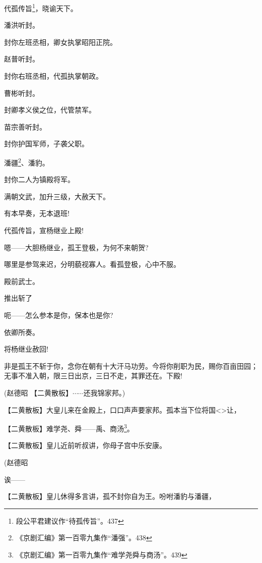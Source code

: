 {代孤传旨}\footnote{ 段公平君建议作``待孤传旨''。{437}}{，晓谕天下。}

{潘洪听封。}

{封你左班丞相，卿女执掌昭阳正院。}

{赵普听封。}

{封你右班丞相，代孤执掌朝政。}

{曹彬听封。}

{封卿孝义侯之位，代管禁军。}

{苗宗善听封。}

{封你护国军师，子袭父职。}

{潘疆}\footnote{ 《京剧汇编》第一{百}零九集作``潘强''。{438}}{、潘豹。}

{封你二人为镇殿将军。}

{满朝文武，加升三级，大赦天下。}

{有本早奏，无本退班!}

{代孤传旨，宣杨继业上殿!}

{嗯------大胆杨继业，孤王登极，为何不来朝贺?}

{哪里是参驾来迟，分明藐视寡人。看孤登极，心中不服。}

{殿前武士。}

{推出斩了}

{呃------怎么参本是你，保本也是你?}

{依卿所奏。}

{将杨继业赦回!}

{非是孤王不斩于你，念你在朝有十大汗马功劳。今将你削职为民，赐你百亩田园；无事不准入朝，限三日出京，三日不走，其罪还在。下殿!}

{(赵德昭 【{\akai 二黄散板}】$\cdots{}\cdots{}$还我锦家邦。)}

\setlength{\hangindent}{60pt} {【{\akai 二黄散板}】大皇儿来在金殿上，口口声声要家邦。}孤本当下位将国\textless{}\!\textgreater{}让，

\setlength{\hangindent}{60pt} {【{\akai 二黄散板}】}难学尧、舜------禹、商汤\footnote{ {《京剧汇编》第一百零九集}作``难学尧舜与商汤''。{439}}。

\setlength{\hangindent}{60pt} {【{\akai 二黄散板}】皇儿近前听叔讲，你母子宫中乐安康。}

{(赵德昭

 }

{诶------}

\setlength{\hangindent}{60pt} {【{\akai 二黄散板}】皇儿休得多言讲，孤不封你自为王。吩咐潘豹与潘疆，}

